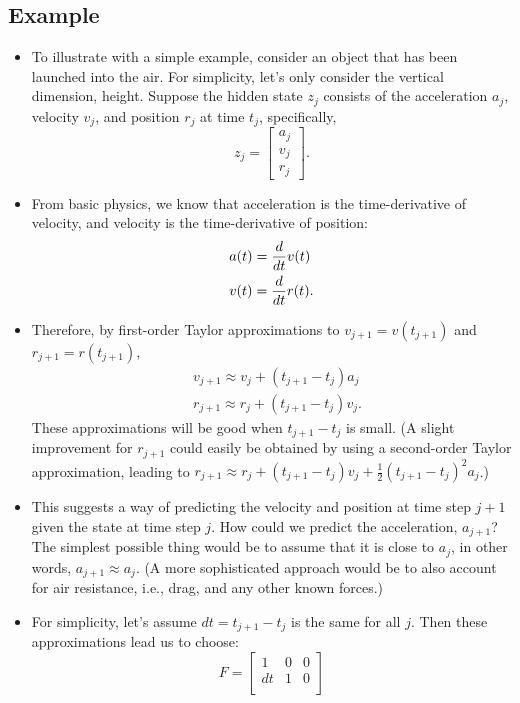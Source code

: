 \documentclass[12pt]{article}
\begin{document}
\subsection{Example}
\begin{itemize}
\item To illustrate with a simple example, consider an object that has been launched into the air. For simplicity, let's only consider the vertical dimension, height. Suppose the hidden state $z_j$ consists of the acceleration $a_j$, velocity $v_j$, and position $r_j$ at time $t_j$, specifically,
$$ z_j = \begin{bmatrix}a_j\\v_j\\r_j \end{bmatrix} .$$
\item From basic physics, we know that acceleration is the time-derivative of velocity, and velocity is the time-derivative of position:
\begin{align*}
& a(t) = {d \over d t} v(t)\\
& v(t) ={d \over d t} r(t).
\end{align*}
\item Therefore, by first-order Taylor approximations to $v_{j+1} = v(t_{j+1})$ and $r_{j+1} = r(t_{j+1})$,
\begin{align*}
& v_{j+1} \approx v_j + (t_{j+1} - t_j) a_j\\
& r_{j+1} \approx r_j + (t_{j+1} - t_j) v_j.
\end{align*}
These approximations will be good when $t_{j+1} - t_j$ is small. (A slight improvement for $r_{j+1}$ could easily be obtained by using a second-order Taylor approximation, leading to $r_{j+1}\approx r_j + (t_{j+1} - t_j) v_j + \tfrac{1}{2} (t_{j+1} - t_j)^2 a_j$.)
\item This suggests a way of predicting the velocity and position at time step $j+1$ given the state at time step $j$.
How could we predict the acceleration, $a_{j+1}$? The simplest possible thing would be to assume that it is close to $a_j$, in other words, $a_{j+1} \approx a_j$. (A more sophisticated approach would be to also account for air resistance, i.e., drag, and any other known forces.)
\item For simplicity, let's assume $dt = t_{j+1} - t_j$ is the same for all $j$. Then these approximations lead us to choose:
$$ F = \begin{bmatrix} 1 & 0 & 0 \\ 
                      dt & 1 & 0 \\ 

\end{bmatrix}$$
\end{itemize}
\end{document}
